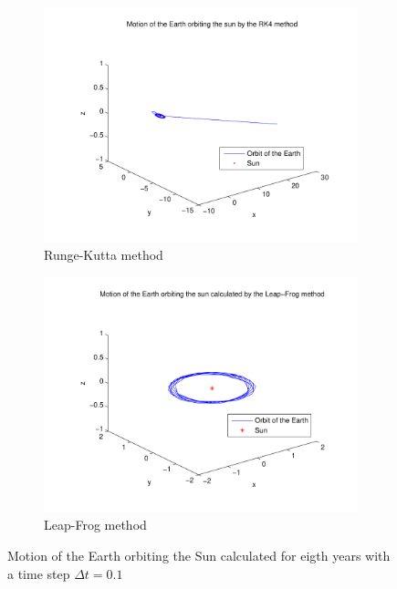 \documentclass[a4paper,12pt, english]{article}
\begin{document}
	
\begin{figure}
        \centering
        \begin{subfigure}[b]{0.6\textwidth}
                \includegraphics[width=\textwidth]{RK4_n_80_t_8.pdf}
                \caption{Runge-Kutta method}
                \label{fig:RK4_dt_0.1}
        \end{subfigure}%
        
        \begin{subfigure}[b]{0.6\textwidth}
                \includegraphics[width=\textwidth]{LF_n_80_t_8.pdf}
                \caption{Leap-Frog method}
                \label{fig:LF_dt_0.1}
        \end{subfigure}
        \caption{Motion of the Earth orbiting the Sun calculated for eigth years with a time step $\Delta t = 0.1$}
\label{dt0.1}   
\end{figure}
\end{document}
